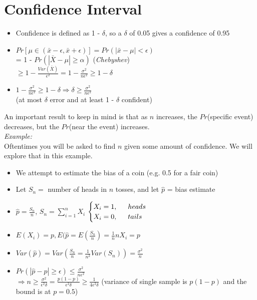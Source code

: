 \documentclass[a4paper]{article}
\begin{document}
\section{Confidence Interval}
\begin{itemize}
        \item Confidence is defined as 1 - $\delta$, so a $\delta $ of 0.05 gives a confidence of 0.95
        \item $Pr[\mu \in (\bar x - \epsilon, \bar x + \epsilon)] = Pr(|\bar x - \mu| < \epsilon)$ \\
        = 1 - $Pr(|\bar X-\mu| \geq \alpha)$ (\textit{Chebyshev})\\
        $\geq 1 - \frac{Var(\bar X)}{\epsilon^2} = 1 - \frac{\sigma^2}{n\epsilon^2} \geq 1 - \delta$
        \item $1 - \frac{\sigma^2}{n\epsilon^2} \geq 1 - \delta \Rightarrow \delta \geq \frac{\sigma^2}{n\epsilon^2}$\\ (at most $\delta$ error and at least 1 - $\delta$ confident)
\end{itemize}
An important result to keep in mind is that as $n$ increases, the $Pr$(specific event) decreases, but the $Pr$(near the event) increases.\\
\textit{Example:}\\
Oftentimes you will be asked to find $n$ given some amount of confidence. We will explore that in this example.
\begin{itemize}
    \item We attempt to estimate the bias of a coin (e.g. 0.5 for a fair coin)
    \item Let $S_n = $ number of heads in $n$ tosses, and let $\hat{p}$ = bias estimate
    \item $\hat{p} = \frac{S_n}{n}$, $S_n = \sum_{i=1}^{n}X_i$ 
    $\begin{cases}
        X_i = 1,\indent heads\\
        X_i = 0, \indent tails
    \end{cases}$
    \item $E(X_i) = p, E(\hat{p} = E(\frac{S_n}{n}) = \frac{1}{n}nX_i = p$
    \item $Var(\hat{p}) = Var(\frac{S_n}{n} = \frac{1}{n^2}Var(S_n)) = \frac{\sigma^2}{n}$
    \item $Pr(|\hat{p} - p| \geq \epsilon) \leq \frac{\sigma^2}{n\epsilon^2}$\\
    $\Rightarrow n \geq \frac{\sigma^2}{\epsilon^2\delta} = \frac{p(1-p)}{\epsilon^2\delta} \geq \frac{1}{4\epsilon^2\delta}$ (variance of single sample is $p(1-p)$ and the bound is at $p = 0.5$)

\end{itemize}
\end{document}
